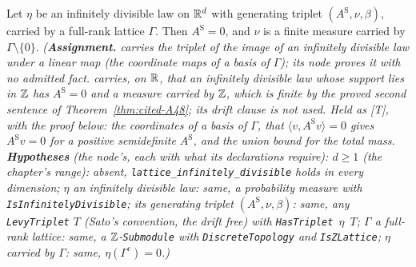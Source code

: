 \begin{lemma}
\label{lem:lattice-infinitely-divisible}
\leanok
{}
Let $\eta$ be an infinitely divisible law on $\mathbb{R}^d$ with generating triplet $(A^{\mathrm S}, \nu, \beta)$,
carried by a full-rank lattice $\Gamma$. Then $A^{\mathrm S} = 0$, and $\nu$ is a finite measure carried by
$\Gamma \setminus \{0\}$.
\statusA\quad{}\quad{}\quad\emph{(\textbf{Assignment.}  carries the
triplet of the image of an infinitely divisible law under a linear map (the coordinate maps of a
basis of $\Gamma$); its node proves it with no admitted fact.  carries, on $\mathbb{R}$, that an infinitely divisible
law whose support lies in $\mathbb{Z}$ has $A^{\mathrm S} = 0$ and a \Levy{} measure carried by $\mathbb{Z}$, which
is finite by the proved second sentence of Theorem~\ref{thm:cited-A48}; its drift clause is not used. Held as [T], with
the proof below: the coordinates of a basis of $\Gamma$, that $\langle v, A^{\mathrm S}v\rangle = 0$ gives
$A^{\mathrm S}v = 0$ for a positive semidefinite $A^{\mathrm S}$, and the union bound for the total mass.
\textbf{Hypotheses} (the node's, each with what its declarations require): $d \ge 1$ (the chapter's
range): absent, \texttt{lattice\_infinitely\_divisible} holds in every dimension; $\eta$ an
infinitely divisible law: same, a probability measure with \texttt{IsInfinitelyDivisible}; its
generating triplet $(A^{\mathrm S}, \nu, \beta)$: same, any \texttt{LevyTriplet} $T$ (Sato's convention, the
drift free) with \texttt{HasTriplet $\eta$ $T$}; $\Gamma$ a full-rank lattice: same, a
$\mathbb{Z}$-\texttt{Submodule} with \texttt{DiscreteTopology} and \texttt{IsZLattice}; $\eta$ carried by
$\Gamma$: same, $\eta(\Gamma^c) = 0$.)}
\end{lemma}

